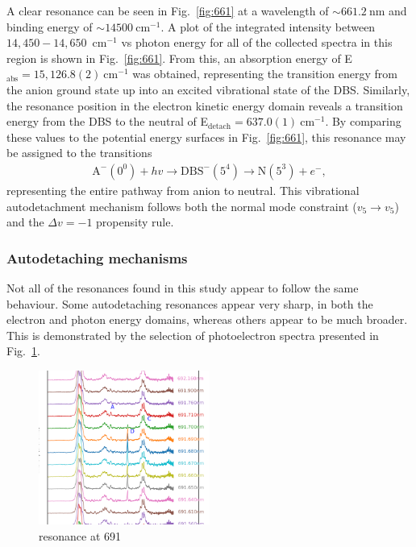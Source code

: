 \documentclass[journal=jpcafh,manuscript=article,layout=onecolumn, 12pt]{achemso}
\begin{document}
A clear resonance can be seen in Fig.~\ref{fig:661} at a wavelength of $\sim661.2~$nm and binding energy of $\sim14500~\text{cm}^{-1}$. A plot of the integrated intensity between $14,450-14,650$~cm$^{-1}$ vs photon energy for all of the collected spectra in this region is shown in Fig.~\ref{fig:661}. From this, an absorption energy of E$_{\text{abs}}=15,126.8(2)~\text{cm}^{-1}$ was obtained, representing the transition energy from the anion ground state up into an excited vibrational state of the DBS. Similarly, the resonance position in the electron kinetic energy domain reveals a transition energy from the DBS to the neutral of E$_{\text{detach}}=637.0(1)~\text{cm}^{-1}$. By comparing these values to the potential energy surfaces in Fig.~\ref{fig:661}, this resonance may be assigned to the transitions
\begin{align*}
	\text{A}^-(0^0) +hv \rightarrow \text{DBS}^-(5^4) \rightarrow \text{N}(5^3) + e^-,
\end{align*}
representing the entire pathway from anion to neutral. This vibrational autodetachment mechanism follows both the normal mode constraint ($v_5\rightarrow v_5$) and the $\Delta v = -1$ propensity rule.

\subsubsection{Autodetaching mechanisms}
Not all of the resonances found in this study appear to follow the same behaviour. Some autodetaching resonances appear very sharp, in both the electron and photon energy domains, whereas others appear to be much broader. This is demonstrated by the selection of photoelectron spectra presented in Fig.~\ref{fig:691}. 

\begin{figure}
	\includegraphics[width=0.5\textwidth]{scripts/691}
	\caption{resonance at 691}
	\label{fig:691}
\end{figure}
\end{document}
